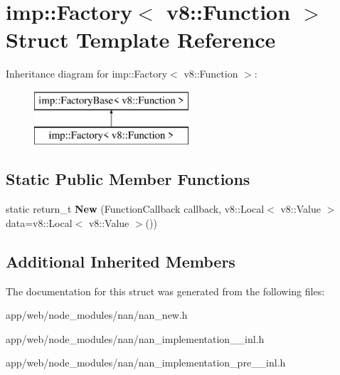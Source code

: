 \hypertarget{structimp_1_1_factory_3_01v8_1_1_function_01_4}{}\section{imp\+:\+:Factory$<$ v8\+:\+:Function $>$ Struct Template Reference}
\label{structimp_1_1_factory_3_01v8_1_1_function_01_4}
Inheritance diagram for imp\+:\+:Factory$<$ v8\+:\+:Function $>$\+:\begin{figure}[H]
\begin{center}
\leavevmode
\includegraphics[height=2.000000cm]{structimp_1_1_factory_3_01v8_1_1_function_01_4}
\end{center}
\end{figure}
\subsection*{Static Public Member Functions}
\begin{DoxyCompactItemize}
\item 
\mbox{\label{structimp_1_1_factory_3_01v8_1_1_function_01_4_a31ca4e171cde259043796578f52ffb59}} 
static return\+\_\+t {\bfseries New} (Function\+Callback callback, v8\+::\+Local$<$ v8\+::\+Value $>$ data=v8\+::\+Local$<$ v8\+::\+Value $>$())
\end{DoxyCompactItemize}
\subsection*{Additional Inherited Members}


The documentation for this struct was generated from the following files\+:\begin{DoxyCompactItemize}
\item 
app/web/node\+\_\+modules/nan/nan\+\_\+new.\+h\item 
app/web/node\+\_\+modules/nan/nan\+\_\+implementation\+\_\+\_\+inl.\+h\item 
app/web/node\+\_\+modules/nan/nan\+\_\+implementation\+\_\+pre\+\_\+\_\+inl.\+h\end{DoxyCompactItemize}

